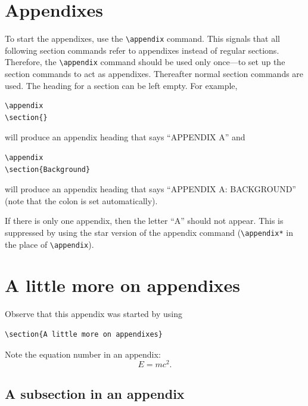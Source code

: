 \documentclass[%
 aip,
 amsmath,amssymb,
 reprint,%
]{revtex4-2}
\begin{document}
\appendix

\section{Appendixes}

To start the appendixes, use the \verb+\appendix+ command.
This signals that all following section commands refer to appendixes
instead of regular sections. Therefore, the \verb+\appendix+ command
should be used only once---to set up the section commands to act as
appendixes. Thereafter normal section commands are used. The heading
for a section can be left empty. For example,
\begin{verbatim}
\appendix
\section{}
\end{verbatim}
will produce an appendix heading that says ``APPENDIX A'' and
\begin{verbatim}
\appendix
\section{Background}
\end{verbatim}
will produce an appendix heading that says ``APPENDIX A: BACKGROUND''
(note that the colon is set automatically).

If there is only one appendix, then the letter ``A'' should not
appear. This is suppressed by using the star version of the appendix
command (\verb+\appendix*+ in the place of \verb+\appendix+).

\section{A little more on appendixes}

Observe that this appendix was started by using
\begin{verbatim}
\section{A little more on appendixes}
\end{verbatim}

Note the equation number in an appendix:
\begin{equation}
E=mc^2.
\end{equation}

\subsection{\label{app:subsec}A subsection in an appendix}
\end{document}
